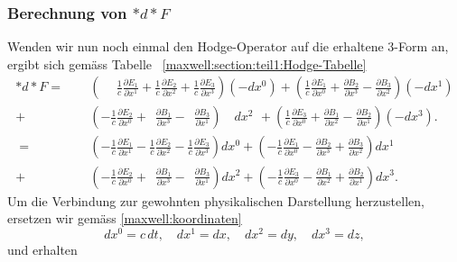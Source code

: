 \subsubsection{Berechnung von $\ast d {\ast} F$}
Wenden wir nun noch einmal den Hodge-Operator auf die erhaltene 3-Form an, ergibt sich gemäss Tabelle ~\ref{maxwell:section:teil1:Hodge-Tabelle}
\begin{align*}
	\ast d {\ast} F 
	= 
	\phantom{+} &\left(\phantom{+} \frac{1}{c}\frac{\partial E_1}{\partial x^1} + \frac{1}{c}\frac{\partial E_2}{\partial x^2} + \frac{1}{c}\frac{\partial E_3}{\partial x^3} \right) (-dx^0) +
	\left(\frac{1}{c}\frac{\partial E_1}{\partial x^0} + \frac{\partial B_2}{\partial x^3} - \frac{\partial B_3}{\partial x^2} \right) (-dx^1)
	\\
	+ &\left( -\frac{1}{c}\frac{\partial E_2}{\partial x^0} + \phantom{\frac{1}{c}} \frac{\partial B_1}{\partial x^3} - \phantom{\frac{1}{c}} \frac{\partial B_3}{\partial x^1} \right) \quad dx^2 \: \, +
	\left( \frac{1}{c}\frac{\partial E_3}{\partial x^0} + \frac{\partial B_1}{\partial x^2} - \frac{\partial B_2}{\partial x^1} \right) (-dx^3).\\[2ex]
	=
	\phantom{+} &\left( -\frac{1}{c}\frac{\partial E_1}{\partial x^1} -\frac{1}{c}\frac{\partial E_2}{\partial x^2} - \frac{1}{c}\frac{\partial E_3}{\partial x^3} \right) dx^0 +
	\left(-\frac{1}{c}\frac{\partial E_1}{\partial x^0} - \frac{\partial B_2}{\partial x^3} + \frac{\partial B_3}{\partial x^2} \right) dx^1
	\\
	+ &\left( -\frac{1}{c}\frac{\partial E_2}{\partial x^0} + \phantom{\frac{1}{c}} \frac{\partial B_1}{\partial x^3} - \phantom{\frac{1}{c}} \frac{\partial B_3}{\partial x^1} \right) dx^2 +
	\left( -\frac{1}{c}\frac{\partial E_3}{\partial x^0} - \frac{\partial B_1}{\partial x^2} + \frac{\partial B_2}{\partial x^1} \right) dx^3.
\end{align*}
Um die Verbindung zur gewohnten physikalischen Darstellung herzustellen, ersetzen wir gemäss \eqref{maxwell:koordinaten}
\begin{equation}
	dx^0 = c\,dt, \quad dx^1 = dx, \quad dx^2 = dy, \quad dx^3 = dz,
\end{equation}
und erhalten
